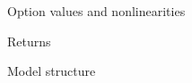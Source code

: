 \begin{frame}
\begin{figure}[htp]\centering
\caption{Option values and nonlinearities}
\end{figure}
\end{frame}
\begin{frame}
\begin{figure}[htp]\centering
\caption{Returns}
\end{figure}
\end{frame}
\begin{frame}
\begin{figure}[htp]\centering
\caption{Model structure}
\end{figure}
\end{frame}

